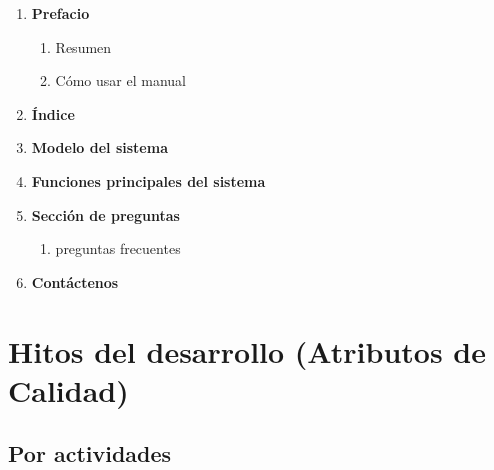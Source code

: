 \begin{framed}
     \begin{enumerate}
		\item \textbf{Prefacio}
		\begin{enumerate}
			\item Resumen
			\item Cómo usar el manual
		\end{enumerate}
		\item \textbf{Índice}
		\item \textbf{Modelo del sistema}
		\item \textbf{Funciones principales del sistema}
		\item \textbf{Sección de preguntas}
		\begin{enumerate}
			\item preguntas frecuentes 
		\end{enumerate}
		\item \textbf{Contáctenos}
	\end{enumerate}
\end{framed}

\section{Hitos del desarrollo (Atributos de Calidad)}

\subsection{Por actividades}

